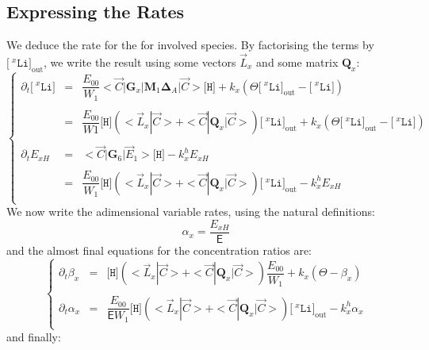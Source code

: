 \documentclass[aps,onecolumn,11pt]{revtex4}
\newcommand{\mychem}[1]{\mathtt{#1}}
\newcommand{\myconc}[1]{\big[#1\big]}
\newcommand{\spLi}[1]{{\!~^{#1}\mychem{Li}}}
\newcommand{\Li}[1]{\myconc{\spLi{#1}}}
\newcommand{\spproton}{\mychem{H}}
\newcommand{\proton}{\myconc{\spproton}}
\newcommand{\myout}[1]{{#1}_{\mathrm{out}}}
\newcommand{\LiOut}[1]{\myout{\Li{#1}}}
\newcommand{\mymat}[1]{{\bm{#1}}}
\begin{document}
\subsection{Expressing the Rates}
We deduce the rate for the for involved species. By factorising the terms by $\LiOut{x}$, we write the result using some vectors 
$\vec{L}_x$ and some matrix $\mymat{Q}_x$:
\begin{equation}
\left\lbrace
\begin{array}{rcl}
\partial_t \Li{x} & = & \dfrac{E_{00}}{W_1}<\vec{C}|\mymat{G}_x|\mymat{M}_1\mymat{\Delta}_A|\vec{C}> \proton+ k_x\left(\Theta \LiOut{x} - \Li{x}\right)\\
\\
 & = & \dfrac{E_{00}}{W1} \proton \left( <\vec{L}_x|\vec{C}> + <\vec{C}|\mymat{Q}_x|\vec{C}>\right) \LiOut{x}+ k_x\left(\Theta \LiOut{x} - \Li{x}\right)\\
 \\
 \partial_t E_{xH} & = & <\vec{C}|\mymat{G}_6|\vec{E}_1> \proton - k_x^h E_{xH}\\
 \\
 & = & \dfrac{E_{00}}{W_1} \proton \left( <\vec{L}_x|\vec{C}> + <\vec{C}|\mymat{Q}_x|\vec{C}>\right) \LiOut{x} - k_x^h E_{xH} \\
\end{array}
\right.
\end{equation}
We now write the adimensional variable rates, using the natural definitions:
\begin{equation}
\alpha_x = \dfrac{E_{xH}}{\mathsf{E}}
\end{equation}
and the almost final equations for the concentration ratios are:
\begin{equation}
\left\lbrace
\begin{array}{rcl}
	\partial_t \beta_x & = & \proton \left( <\vec{L}_x|\vec{C}> + <\vec{C}|\mymat{Q}_x|\vec{C}> \right)  \dfrac{E_{00}}{W_1} + k_x \left(\Theta - \beta_x\right)\\
	\\
	\partial_t \alpha_{x} & = &  \dfrac{E_{00}}{\mathsf{E}W_1} \proton \left( <\vec{L}_x|\vec{C}> + <\vec{C}|\mymat{Q}_x|\vec{C}>\right) \LiOut{x} - k_x^h \alpha_{x}\\
\end{array}
\right.
\end{equation}
and finally:
\end{document}
